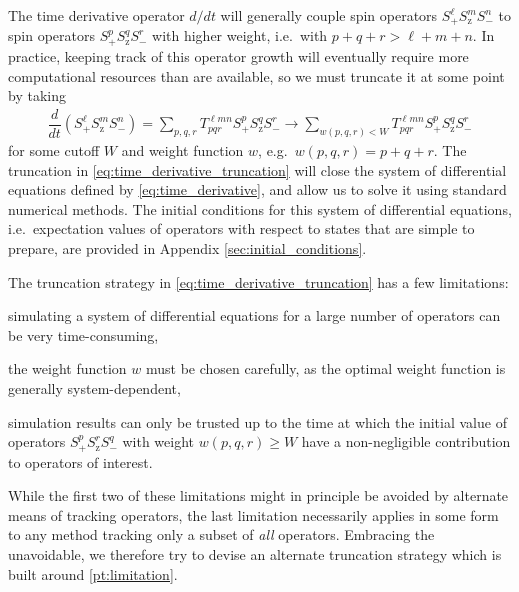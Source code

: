 \documentclass[aps,notitlepage,nofootinbib,11pt]{revtex4-1}
\newcommand{\f}[2]{\dfrac{#1}{#2}} %
\newcommand{\p}[1]{\left(#1\right)} %
\newcommand{\z}{\text{z}}
\newcommand{\1}{\mathds{1}}
\begin{document}
The time derivative operator $d/dt$ will generally couple spin
operators $S_+^\ell S_\z^m S_-^n$ to spin operators
$S_+^p S_\z^q S_-^r$ with higher weight, i.e.~with $p+q+r>\ell+m+n$.
In practice, keeping track of this operator growth will eventually
require more computational resources than are available, so we must
truncate it at some point by taking
\begin{align}
  \f{d}{dt} \p{S_+^\ell S_\z^m S_-^n}
  = \sum_{p,q,r} T^{\ell m n}_{pqr} S_+^p S_\z^q S_-^r
  \to \sum_{w\p{p,q,r}<W} T^{\ell m n}_{pqr} S_+^p S_\z^q S_-^r
  \label{eq:time_derivative_truncation}
\end{align}
for some cutoff $W$ and weight function $w$, e.g.~$w\p{p,q,r}=p+q+r$.
The truncation in \eqref{eq:time_derivative_truncation} will close the
system of differential equations defined by
\eqref{eq:time_derivative}, and allow us to solve it using standard
numerical methods.  The initial conditions for this system of
differential equations, i.e.~expectation values of operators with
respect to states that are simple to prepare, are provided in Appendix
\ref{sec:initial_conditions}.

The truncation strategy in \eqref{eq:time_derivative_truncation} has a
few limitations:
\begin{enumerate*}[label=(\roman*)]
\item simulating a system of differential equations for a large number
  of operators can be very time-consuming,
\item the weight function $w$ must be chosen carefully, as the optimal
  weight function is generally system-dependent,
\item simulation results can only be trusted up to the time at which
  the initial value of operators $S_+^p S_\z^r S_-^q$ with weight
  $w\p{p,q,r}\ge W$ have a non-negligible contribution to operators of
  interest.
  \label{pt:limitation}
\end{enumerate*}
While the first two of these limitations might in principle be avoided
by alternate means of tracking operators, the last limitation
necessarily applies in some form to any method tracking only a subset
of {\it all} operators.  Embracing the unavoidable, we therefore try
to devise an alternate truncation strategy which is built around
\ref{pt:limitation}.
\end{document}

